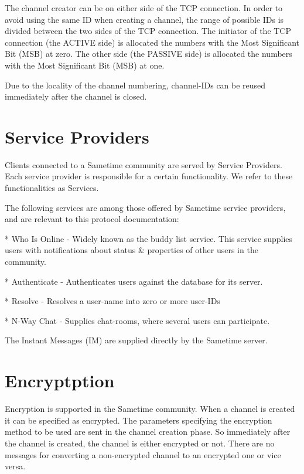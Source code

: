 \documentclass[titlepage,oneside]{book}
\begin{document}
\par{} The channel creator can be on either side of the TCP
connection. In order to avoid using the same ID when creating a
channel, the range of possible IDs is divided between the two sides of
the TCP connection.  The initiator of the TCP connection (the ACTIVE
side) is allocated the numbers with the Most Significant Bit (MSB) at
zero. The other side (the PASSIVE side) is allocated the numbers with
the Most Significant Bit (MSB) at one.

\par{} Due to the locality of the channel numbering, channel-IDs can
be reused immediately after the channel is closed.

\section{Service Providers}

\par{} Clients connected to a Sametime community are served by Service
Providers. Each service provider is responsible for a certain
functionality. We refer to these functionalities as Services.

\par{} The following services are among those offered by Sametime
service providers, and are relevant to this protocol documentation:

\par{} * Who Is Online - Widely known as the buddy list service. This
service supplies users with notifications about status \& properties of
other users in the community.

\par{} * Authenticate - Authenticates users against the database for
its server.

\par{} * Resolve - Resolves a user-name into zero or more user-IDs

\par{} * N-Way Chat - Supplies chat-rooms, where several users can
participate.

\par{} The Instant Messages (IM) are supplied directly by the Sametime
server.

\section{Encryptption}

\par{} Encryption is supported in the Sametime community. When a
channel is created it can be specified as encrypted. The parameters
specifying the encryption method to be used are sent in the channel
creation phase. So immediately after the channel is created, the
channel is either encrypted or not. There are no messages for
converting a non-encrypted channel to an encrypted one or vice versa.
\end{document}
